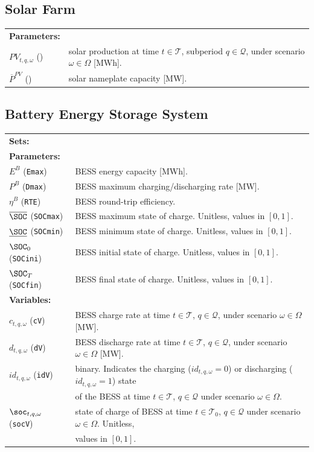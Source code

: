 \subsection{Solar Farm}
\label{SEC:SolarFarm2}

\begin{tabularx}{\textwidth}{l X}
    
    \textbf{Parameters:} \\
	$PV_{t,q, \omega}$ (\text{pPV}) & solar production at time $t \in \mathcal{T}$, subperiod $q \in \mathcal{Q}$, under scenario $\omega \in \Omega$ [MWh]. \\
	$\overline{P}^{PV}$ (\text{max\_pPV}) & solar nameplate capacity [MW]. \\
\end{tabularx}

\subsection{Battery Energy Storage System}
\label{SEC:BatteryEnergyStorageSystem2}

\begin{tabularx}{\textwidth}{l X}
\textbf{Sets:} \\[1mm]

\textbf{Parameters:} \\
$E^B$ (\texttt{Emax}) & BESS energy capacity [MWh]. \\
$P^B$ (\texttt{Dmax}) & BESS maximum charging/discharging rate [MW]. \\
$\eta^B$ (\texttt{RTE}) & BESS round-trip efficiency. \\
$\overline{\SOC}$ (\texttt{SOCmax}) & BESS maximum state of charge. Unitless, values in $[0, 1]$. \\
$\underline{\SOC}$ (\texttt{SOCmin}) & BESS minimum state of charge. Unitless, values in $[0, 1]$. \\
$\SOC_0$ (\texttt{SOCini}) & BESS initial state of charge. Unitless, values in $[0, 1]$. \\
$\SOC_T$ (\texttt{SOCfin}) & BESS final state of charge. Unitless, values in $[0, 1]$. \\[1mm]

\textbf{Variables:} \\
$c_{t,q, \omega}$ (\texttt{cV}) & BESS charge rate at time $t \in \mathcal{T}$, $q \in \mathcal{Q}$, under scenario $\omega \in \Omega$ [MW]. \\
$d_{t,q, \omega}$ (\texttt{dV}) & BESS discharge rate at time $t \in \mathcal{T}$, $q \in \mathcal{Q}$, under scenario $\omega \in \Omega$ [MW]. \\	
$id_{t,q, \omega}$ (\texttt{idV}) & binary. Indicates the charging ($id_{t,q, \omega} = 0$) or discharging ($id_{t,q, \omega} = 1$) state \\
& of the BESS at time $t \in \mathcal{T}$, $q \in \mathcal{Q}$ under scenario $\omega \in \Omega$. \\
$\soc_{t,q, \omega}$ (\texttt{socV}) & state of charge of BESS at time $t \in \mathcal{T}_0$, $q \in \mathcal{Q}$ under scenario $\omega \in \Omega$. Unitless, \\
& values in $[0, 1]$. \\[1mm]
\end{tabularx}

